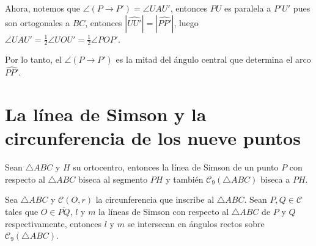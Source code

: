 Ahora, notemos que $\angle (P\longrightarrow P')=\angle UAU'$, entonces $PU$ es paralela a $P'U'$ pues son ortogonales a $BC$, entonces $|\widehat{UU'}|=|\widehat{PP'}|$, luego $\angle UAU'=\frac{1}{2}\angle UOU'=\frac{1}{2}\angle POP'$.

Por lo tanto, el $\angle (P\longrightarrow P')$ es la mitad del ángulo central que determina el arco $\widehat{PP'}$.


\section{La línea de Simson y la circunferencia de los nueve puntos}
\begin{teo}
Sean $\triangle ABC$ y $H$ su ortocentro, entonces la línea de Simson de un punto $P$ con respecto al $\triangle ABC$ biseca al segmento $PH$ y también $\mathcal{C}_{9}(\triangle ABC)$ biseca a $PH$. 
\end{teo}

\begin{teo}
Sea $\triangle ABC$ y $\mathcal{C}(O,r)$ la circunferencia que inscribe al $\triangle ABC$. Sean $P,Q\in\mathcal{C}$ tales que $O\in\overline{PQ}$, $l$ y $m$ la líneas de Simson con respecto al $\triangle ABC$ de $P$ y $Q$ respectivamente, entonces $l$ y $m$ se intersecan en ángulos rectos sobre $\mathcal{C}_{9}(\triangle ABC)$. 
\end{teo}


